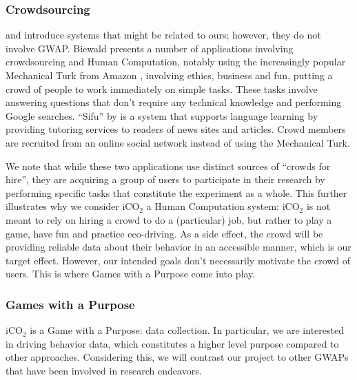 \documentclass[preprint,authoryear,12pt]{elsarticle}
\makeatletter
\renewcommand{\paragraph}{\@startsection{paragraph}{4}{\z@}%
  {-3.25ex\@plus -1ex \@minus -.2ex}%
  {1.5ex \@plus .2ex}%
  {\normalfont\normalsize\mdseries}}
\newcommand{\commentHidden}[1]{}  %
\newcommand{\commentShow}[1] {} %
\makeatother
\begin{document}
\subsubsection{Crowdsourcing}

\cite{Biewald:2012} and \citep{ChanH12} introduce systems that might be related to ours; however, they do not involve GWAP. Biewald presents a number of applications involving crowdsourcing and Human Computation, notably using the increasingly popular Mechanical Turk from Amazon \citep{MechTurk}, involving ethics, business and fun, putting a crowd of people to work immediately on simple tasks. These tasks involve answering questions that don't require any technical knowledge and performing Google searches. ``Sifu'' by \citep{ChanH12} is a system that supports language learning by providing tutoring services to readers of news sites and articles. Crowd members are recruited from an online social network instead of using the Mechanical Turk.

We note that while these two applications use distinct sources of ``crowds for hire'', they are acquiring a group of users to participate in their research by performing specific tasks that constitute the experiment as a whole. This further illustrates why we consider iCO$_2$ a Human Computation system: iCO$_2$ is not meant to rely on hiring a crowd to do a (particular) job, but rather to play a game, have fun and practice eco-driving. As a side effect, the crowd will be providing reliable data about their behavior in an accessible manner, which is our target effect. However, our intended goals don't necessarily motivate the crowd of users. This is where Games with a Purpose come into play.

\subsubsection{Games with a Purpose}

\commentShow{This section describes a lot of GWAP however such a detailed description is not needed.}


iCO$_2$ is a Game with a Purpose: data collection. In particular, we are interested in driving behavior data, which constitutes a higher level purpose compared to other approaches. \commentHidden{what other approaches? } Considering this, we will contrast our project to other GWAPs that have been involved in research endeavors. \commentShow{endeavors for what ?}

\end{document}
